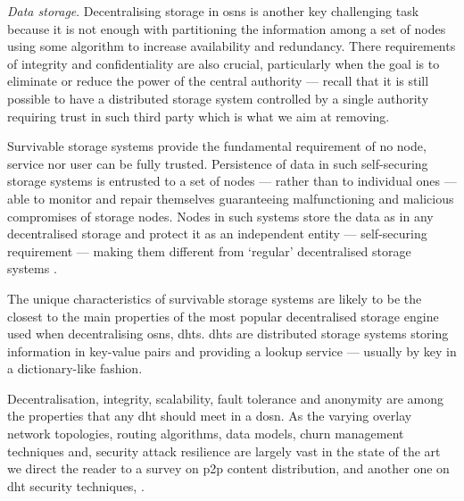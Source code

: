 \documentclass[showtrims, oldfontcommands]{kthesis}
\begin{document}
\textit{Data storage}. Decentralising storage in \acp{osn} is another key challenging 
task because it is not enough with partitioning the information among a set of nodes 
using some algorithm to increase availability and redundancy. There requirements 
of integrity and confidentiality are also crucial, particularly when the goal is 
to eliminate or reduce the power of the central authority --- recall that it is 
still possible to have a distributed storage system controlled by a single authority 
requiring trust in such third party which is what we aim at removing.

Survivable storage systems provide the fundamental requirement of no node, service 
nor user can be fully trusted. Persistence of data in such self-securing storage 
systems is entrusted to a set of nodes --- rather than to individual ones --- able 
to monitor and repair themselves guaranteeing malfunctioning and malicious compromises 
of storage nodes. Nodes in such systems store the data as in any decentralised storage 
and protect it as an independent entity --- self-securing requirement --- making 
them different from `regular' decentralised storage systems \cite{WylieBSGKK00}.
 
The unique characteristics of survivable storage systems are likely to be the closest 
to the main properties of the most popular decentralised storage engine used when 
decentralising \acp{osn}, \acp{dht}. \acp{dht} are distributed storage systems storing 
information in key-value pairs and providing a lookup service --- usually by key 
in a dictionary-like fashion.

Decentralisation, integrity, scalability, fault tolerance and anonymity are among 
the properties that any \ac{dht} should meet in a \ac{dosn}. As the varying overlay 
network topologies, routing algorithms, data models, churn management techniques and, 
security attack resilience are largely vast in the state of the art we direct the 
reader to a survey on \ac{p2p} content distribution, \cite{Androutsellis-TheotokisSLS10} 
and another one on \ac{dht} security techniques, \cite{UrdanetaPS11}.



\end{document}
